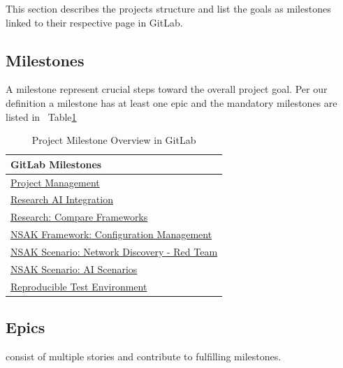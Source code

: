 This section describes the projects structure and list the goals as milestones linked to their respective page in GitLab.

\subsection{Milestones}\label{subsec:milestone} A milestone represent crucial steps toward the overall project goal.
Per our definition a milestone has at least one epic and the mandatory milestones are listed in ~Table\ref{tab:gitlab-milestones}

\begin{table}[H]
	\centering
	\begin{tabular}{l}
		\toprule
		\textbf{GitLab Milestones} \\
		\midrule
		\href{https://gitlab.ti.bfh.ch/groups/gausf1-vonal3/-/milestones/1#tab-issues}{Project Management} \\
		\href{https://gitlab.ti.bfh.ch/groups/gausf1-vonal3/-/milestones/19#tab-issues}{Research AI Integration} \\
		\href{https://gitlab.ti.bfh.ch/groups/gausf1-vonal3/-/milestones/16#tab-issues}{Research: Compare Frameworks} \\
		\href{https://gitlab.ti.bfh.ch/groups/gausf1-vonal3/-/milestones/5#tab-issues}{NSAK Framework: Configuration Management} \\
		\href{https://gitlab.ti.bfh.ch/groups/gausf1-vonal3/-/milestones/7#tab-issues}{NSAK Scenario: Network Discovery - Red Team} \\
		\href{https://gitlab.ti.bfh.ch/groups/gausf1-vonal3/-/milestones/18#tab-issues}{NSAK Scenario: AI Scenarios} \\
		\href{https://gitlab.ti.bfh.ch/groups/gausf1-vonal3/-/milestones/20}{Reproducible Test Environment} \\
		\bottomrule
	\end{tabular}
	\caption{Project Milestone Overview in GitLab}
	\label{tab:gitlab-milestones}
\end{table}









\subsection{Epics}\label{subsec:epic} consist of multiple stories and contribute to fulfilling milestones.

